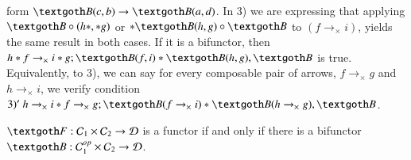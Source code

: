 \documentclass [12pt]{book}
\begin{document}
form $\textgoth B(c,b)\rightarrow\textgoth B(a,d)$. In 3) we are expressing that applying $\textgoth B\circ(h*,*g)$ or $*\textgoth B(h,g)\circ\textgoth B$ to $(f\rightarrow_\times i)$, yields the same result in both cases. If it is a bifunctor, then $h*f\rightarrow_\times i*g;\textgoth B(f,i)*\textgoth B(h,g),\textgoth B$ is true. Equivalently, to 3), we can say for every composable pair of arrows, $f\rightarrow_\times g$ and $h\rightarrow_\times i$, we verify condition $3)'~h\rightarrow_\times i*f\rightarrow_\times g;\textgoth B(f\rightarrow_\times i)*\textgoth B(h\rightarrow_\times g),\textgoth B$.

\begin{proposition}$\textgoth F:\mathcal C_1\times\mathcal C_2\rightarrow\mathcal D$ is a functor if and only if there is a bifunctor $\textgoth B:\mathcal C_1^{op}\times\mathcal C_2\rightarrow\mathcal D$.\label{bif prop2}\end{proposition}
\end{document}
